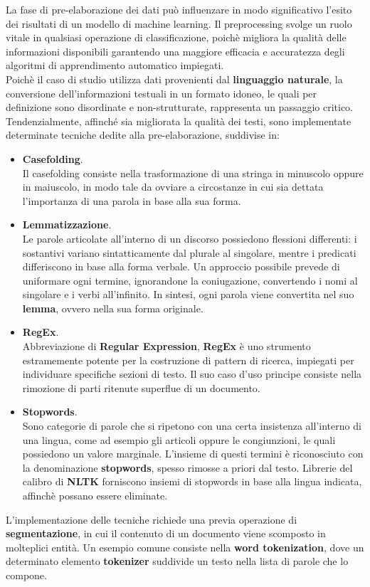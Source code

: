 La fase di pre-elaborazione dei dati può influenzare in modo significativo l'esito dei risultati di un modello di machine learning. Il preprocessing svolge un ruolo vitale in qualsiasi operazione di classificazione, poichè migliora la qualità delle informazioni disponibili garantendo una maggiore efficacia e accuratezza degli algoritmi di apprendimento automatico impiegati. \vspace{7pt} \\
Poichè il caso di studio utilizza dati provenienti dal \textbf{linguaggio naturale}, la conversione dell'informazioni testuali in un formato idoneo, le quali per definizione sono disordinate e non-strutturate, rappresenta un passaggio critico. \vspace{7pt} \\
Tendenzialmente, affinché sia migliorata la qualità dei testi, sono implementate determinate tecniche dedite alla pre-elaborazione, suddivise in:
\begin{itemize}
    \renewcommand{\labelitemi}{-}
    \item \textbf{Casefolding}. \\ Il casefolding consiste nella trasformazione di una stringa in minuscolo oppure in maiuscolo, in modo tale da ovviare a circostanze in cui sia dettata l'importanza di una parola in base alla sua forma.
    \item \textbf{Lemmatizzazione}. \\ Le parole articolate all'interno di un discorso possiedono flessioni differenti: i sostantivi variano sintatticamente dal plurale al singolare, mentre i predicati differiscono in base alla forma verbale. Un approccio possibile prevede di uniformare ogni termine, ignorandone la coniugazione, convertendo i nomi al singolare e i verbi all'infinito. In sintesi, ogni parola viene convertita nel suo \textbf{lemma}, ovvero nella sua forma originale.
    \item \textbf{RegEx}. \\ Abbreviazione di \textbf{Regular Expression}, \textbf{RegEx} è uno strumento estramemente potente per la costruzione di pattern di ricerca, impiegati per individuare specifiche sezioni di testo. Il suo caso d'uso principe consiste nella rimozione di parti ritenute superflue di un documento.
    \item \textbf{Stopwords}. \\ Sono categorie di parole che si ripetono con una certa insistenza all'interno di una lingua, come ad esempio gli articoli oppure le congiunzioni, le quali possiedono un valore marginale. L'insieme di questi termini è riconosciuto con la denominazione \textbf{stopwords}, spesso rimosse a priori dal testo. Librerie del calibro di \textbf{NLTK} forniscono insiemi di stopwords in base alla lingua indicata, affinchè possano essere eliminate.
\end{itemize}
L'implementazione delle tecniche richiede una previa operazione di \textbf{segmentazione}, in cui il contenuto di un documento viene scomposto in molteplici entità. Un esempio comune consiste nella \textbf{word tokenization}, dove un determinato elemento \textbf{tokenizer} suddivide un testo nella lista di parole che lo compone.